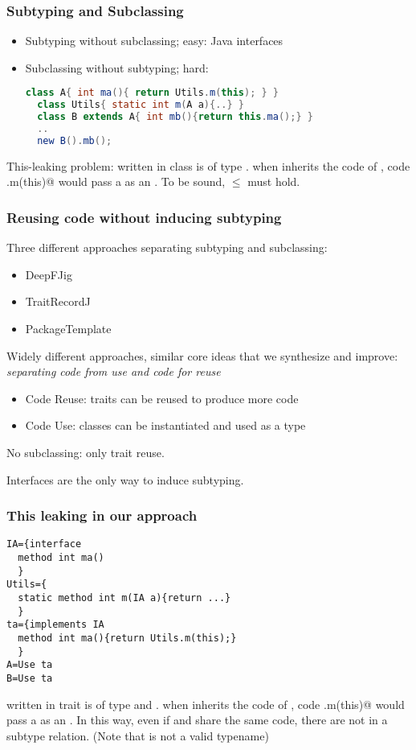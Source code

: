 
\begin{frame}[fragile]
\frametitle{Subtyping and Subclassing}

\begin{itemize}
\item Subtyping without subclassing;
easy: Java interfaces

\item Subclassing without subtyping;
hard:
\begin{lstlisting}[language=Java]
  class A{ int ma(){ return Utils.m(this); } }
  class Utils{ static int m(A a){..} }
  class B extends A{ int mb(){return this.ma();} }
  ..
  new B().mb();
\end{lstlisting}
\end{itemize}


This-leaking problem:
\Q@this@ written in class \Q@A@ is of type \Q@A@.
when \Q@B@ inherits the code of \Q@A@,
code \Q@Uitls.m(this)@ would pass a \Q@this@
as an \Q@A@. To be sound, 
\Q@B@ $\leq$ \Q@A@ must hold. 
\end{frame}



\begin{frame}[fragile]
\frametitle{Reusing code without inducing subtyping}

Three different approaches separating subtyping and subclassing:
\begin{itemize}
\item DeepFJig
\item TraitRecordJ
\item PackageTemplate
\end{itemize}
Widely different approaches,
similar core ideas that we synthesize and improve:
\emph{separating code from use and code for reuse}

\begin{itemize}
\item Code Reuse: traits can be reused to produce more code
\item Code Use: classes can be instantiated and used as a type
\end{itemize}

No subclassing: only trait reuse.

Interfaces are the only way to induce subtyping.
\end{frame}

\begin{frame}[fragile]
\frametitle{This leaking in our approach}

\begin{lstlisting}
IA={interface
  method int ma()
  }
Utils={
  static method int m(IA a){return ...} 
  }
ta={implements IA
  method int ma(){return Utils.m(this);}
  }
A=Use ta
B=Use ta
\end{lstlisting}

\Q@this@ written in trait \Q@ta@ is of type \Q@This@ and \Q@IA@.
when \Q@B@ inherits the code of \Q@ta@,
code \Q@Uitls.m(this)@ would pass a \Q@this@
as an \Q@IA@. In this way, even if
\Q@B@ and \Q@A@ share the same code, there
are not in a subtype relation.
(Note that \Q@ta@ is not a valid typename)
\end{frame}


